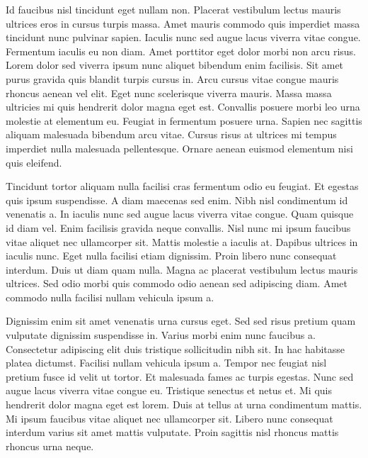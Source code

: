 \documentclass[11pt,a4paper]{article}
\begin{document}
Id faucibus nisl tincidunt eget nullam non. Placerat vestibulum lectus mauris ultrices eros in cursus turpis massa. Amet mauris commodo quis imperdiet massa tincidunt nunc pulvinar sapien. Iaculis nunc sed augue lacus viverra vitae congue. Fermentum iaculis eu non diam. Amet porttitor eget dolor morbi non arcu risus. Lorem dolor sed viverra ipsum nunc aliquet bibendum enim facilisis. Sit amet purus gravida quis blandit turpis cursus in. Arcu cursus vitae congue mauris rhoncus aenean vel elit. Eget nunc scelerisque viverra mauris. Massa massa ultricies mi quis hendrerit dolor magna eget est. Convallis posuere morbi leo urna molestie at elementum eu. Feugiat in fermentum posuere urna. Sapien nec sagittis aliquam malesuada bibendum arcu vitae. Cursus risus at ultrices mi tempus imperdiet nulla malesuada pellentesque. Ornare aenean euismod elementum nisi quis eleifend.

Tincidunt tortor aliquam nulla facilisi cras fermentum odio eu feugiat. Et egestas quis ipsum suspendisse. A diam maecenas sed enim. Nibh nisl condimentum id venenatis a. In iaculis nunc sed augue lacus viverra vitae congue. Quam quisque id diam vel. Enim facilisis gravida neque convallis. Nisl nunc mi ipsum faucibus vitae aliquet nec ullamcorper sit. Mattis molestie a iaculis at. Dapibus ultrices in iaculis nunc. Eget nulla facilisi etiam dignissim. Proin libero nunc consequat interdum. Duis ut diam quam nulla. Magna ac placerat vestibulum lectus mauris ultrices. Sed odio morbi quis commodo odio aenean sed adipiscing diam. Amet commodo nulla facilisi nullam vehicula ipsum a.

Dignissim enim sit amet venenatis urna cursus eget. Sed sed risus pretium quam vulputate dignissim suspendisse in. Varius morbi enim nunc faucibus a. Consectetur adipiscing elit duis tristique sollicitudin nibh sit. In hac habitasse platea dictumst. Facilisi nullam vehicula ipsum a. Tempor nec feugiat nisl pretium fusce id velit ut tortor. Et malesuada fames ac turpis egestas. Nunc sed augue lacus viverra vitae congue eu. Tristique senectus et netus et. Mi quis hendrerit dolor magna eget est lorem. Duis at tellus at urna condimentum mattis. Mi ipsum faucibus vitae aliquet nec ullamcorper sit. Libero nunc consequat interdum varius sit amet mattis vulputate. Proin sagittis nisl rhoncus mattis rhoncus urna neque.
\end{document}
